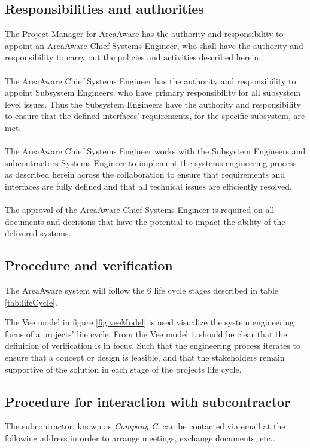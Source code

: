 \subsection{Responsibilities and authorities}
The Project Manager for AreaAware has the authority and responsibility to appoint an AreaAware Chief Systems Engineer, who shall have the authority and responsibility to carry out the policies and activities described herein.\\\\
The AreaAware Chief Systems Engineer has the authority and responsibility to appoint Subsystem Engineers, who have primary responsibility for all subsystem level issues.
Thus the Subsystem Engineers have the authority and responsibility to ensure that the defined interfaces' requirements, for the specific subsystem, are met.\\\\
The AreaAware Chief Systems Engineer works with the Subsystem Engineers and subcontractors Systems Engineer to implement the systems engineering process as described herein across the collaboration to ensure that requirements and interfaces are fully defined and that all technical issues are efficiently resolved.\\\\
The approval of the AreaAware Chief Systems Engineer is required on all documents and decisions that have the potential to impact the ability of the delivered systems.

\subsection{Procedure and verification}
The AreaAware system will follow the 6 life cycle stages described in table \ref{tab:lifeCycle}.


The Vee model in figure \ref{fig:veeModel} is used visualize the system engineering focus of a projects' life cycle.
From the Vee model it should be clear that the definition of verification is in focus.
Such that the engineering process iterates to ensure that a concept or design is feasible, and that the stakeholders remain supportive of the solution in each stage of the projects life cycle.


\subsection{Procedure for interaction with subcontractor}
The subcontractor, known as \emph{Company C}, can be contacted via email at the following address in order to arrange meetings, exchange documents, etc..\\\\

